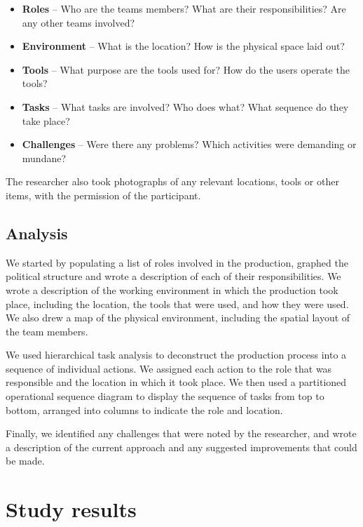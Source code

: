 {\singlespacing
\begin{itemize}
	\item \textbf{Roles} -- Who are the teams members? What are their responsibilities? Are any other teams involved?
	\item \textbf{Environment} -- What is the location? How is the physical space laid out?
	\item \textbf{Tools} -- What purpose are the tools used for? How do the users operate the tools?
	\item \textbf{Tasks} -- What tasks are involved? Who does what? What sequence do they take place?
	\item \textbf{Challenges} -- Were there any problems? Which activities were demanding or mundane?
\end{itemize}
}

The researcher also took photographs of any relevant locations, tools or other items, with the permission of the
participant.

\subsection{Analysis}

We started by populating a list of roles involved in the production, graphed the political structure and wrote a
description of each of their responsibilities. We wrote a description of the working environment in which the
production took place, including the location, the tools that were used, and how they were used. We also drew a map of
the physical environment, including the spatial layout of the team members.

We used hierarchical task analysis \citep{Kirwan1992,Annett2000} to deconstruct the production process into a sequence
of individual actions. We assigned each action to the role that was responsible and the location in which it took
place. We then used a partitioned operational sequence diagram \citep{Kirwan1992} to display the sequence of tasks from
top to bottom, arranged into columns to indicate the role and location.

Finally, we identified any challenges that were noted by the researcher, and wrote a description of the current
approach and any suggested improvements that could be made.

\section{Study results}\label{sec:ethno-results}

